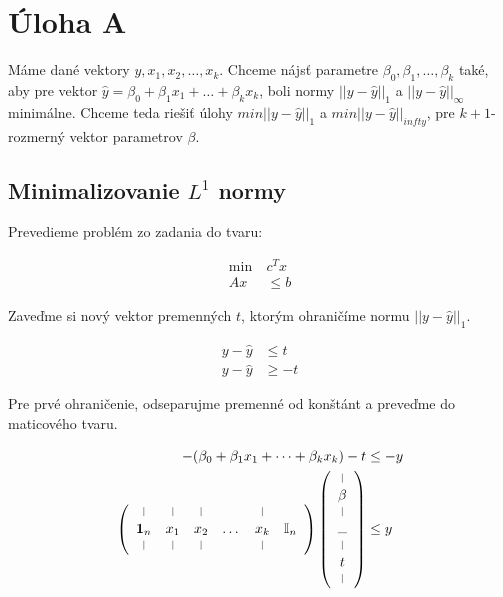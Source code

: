 \documentclass[12pt,oneside,a4paper,slovak]{article}
\newcommand*{\vertbar}{\rule[0ex]{0.3pt}{1.5ex}}
\newcommand*{\horzbar}{\rule[0ex]{1.5ex}{0.3pt}}
\begin{document}
   

\section*{Úloha A}

Máme dané vektory $y, x_1, x_2, \dots, x_k$. Chceme nájsť parametre $\beta_0, \beta_1,\dots,\beta_k$ také, aby pre vektor $\hat{y} = \beta_0 + \beta_1x_1 + \dots + \beta_kx_k$, boli normy $||y - \hat{y}||_1$ a $||y - \hat{y}||_{\infty}$ minimálne. Chceme teda riešiť úlohy $min ||y - \hat{y}||_1$ a $min ||y - \hat{y}||_{infty}$, pre $k+1$-rozmerný vektor parametrov $\beta$.

\subsection*{Minimalizovanie $L^1$ normy}

Prevedieme problém zo zadania do tvaru:

\begin{align*}
	\text{min}~ &c^Tx\\
	Ax &\leq b
\end{align*}

Zaveďme si nový vektor premenných $t$, ktorým ohraničíme normu $||y - \hat{y}||_1$.

\begin{align*}
	y - \hat{y} &\leq t \\
	y - \hat{y} &\geq -t
\end{align*}	

Pre prvé ohraničenie, odseparujme premenné od konštánt a preveďme do maticového tvaru.


\begin{align*}
	- (\beta_0 + \beta_1x_1 + \dots + \beta_kx_k) - t &\leq -y \\
	\left(
	\begin{array}{cccccc}
		\vertbar & \vertbar & \vertbar &  & \vertbar &  \\
		\mathbf{1}_n & x_1 & x_2 & \dots & x_k & \mathbb{I}_n\\
		\vertbar & \vertbar & \vertbar &  & \vertbar &
	\end{array}
	\right)
	\left(
	\begin{array}{c}
		\vertbar \\
		\beta \\
		\vertbar \\
		\horzbar \\
		\vertbar \\
		t \\
		\vertbar
	\end{array}
	\right) &\leq y
\end{align*}
\end{document}

